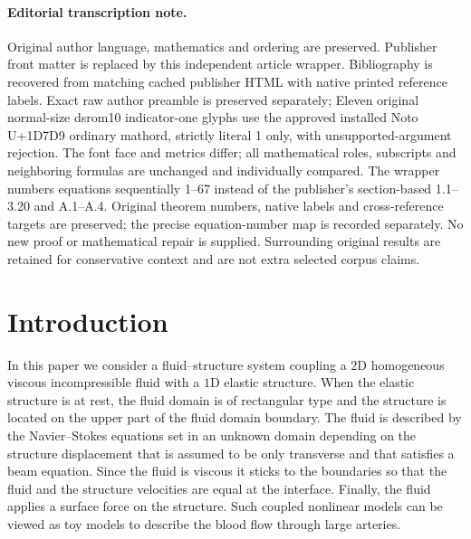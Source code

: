 \documentclass[11pt]{article}
\theoremstyle{remark}
\theoremstyle{definition}
\begin{document}
\paragraph{Editorial transcription note.}
Original author language, mathematics and ordering are preserved. Publisher front matter is replaced by this independent article wrapper. Bibliography is recovered from matching cached publisher HTML with native printed reference labels. Exact raw author preamble is preserved separately; Eleven original normal-size dsrom10 indicator-one glyphs use the approved installed Noto U+1D7D9 ordinary mathord, strictly literal 1 only, with unsupported-argument rejection. The font face and metrics differ; all mathematical roles, subscripts and neighboring formulas are unchanged and individually compared. The wrapper numbers equations sequentially 1--67 instead of the publisher's section-based 1.1--3.20 and A.1--A.4. Original theorem numbers, native labels and cross-reference targets are preserved; the precise equation-number map is recorded separately. No new proof or mathematical repair is supplied. Surrounding original results are retained for conservative context and are not extra selected corpus claims.
\clearpage

\section{Introduction}

In this paper we consider a fluid--structure system coupling a $2$D homogeneous viscous incompressible fluid with a $1$D
elastic structure. When the elastic structure is at rest, the fluid domain is of rectangular type and the structure is located on the upper part of the fluid domain boundary. The fluid is described by the Navier--Stokes equations set in an unknown domain depending on the structure displacement that is assumed to be only transverse and that satisfies a beam equation. Since the fluid is viscous it sticks to the boundaries so that the fluid and the structure velocities are equal at the interface. Finally, the fluid applies a surface force on the structure. Such coupled nonlinear models can be viewed as toy models to describe the blood flow through large arteries.\enlargethispage{\baselineskip}%
\end{document}
